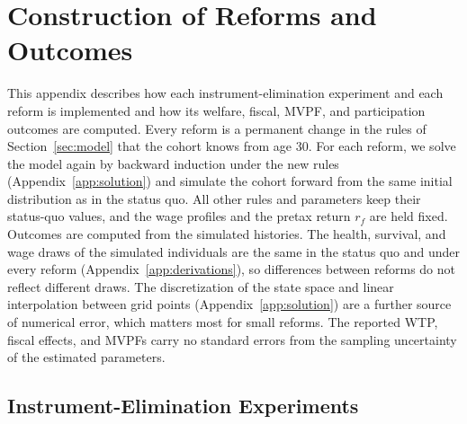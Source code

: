 \section{Construction of Reforms and Outcomes}\label{app:reforms}

This appendix describes how each instrument-elimination experiment and each reform is implemented and how its welfare, fiscal, MVPF, and participation outcomes are computed. Every reform is a permanent change in the rules of Section~\ref{sec:model} that the cohort knows from age 30. For each reform, we solve the model again by backward induction under the new rules (Appendix~\ref{app:solution}) and simulate the cohort forward from the same initial distribution as in the status quo. All other rules and parameters keep their status-quo values, and the wage profiles and the pretax return $r_f$ are held fixed. Outcomes are computed from the simulated histories. The health, survival, and wage draws of the simulated individuals are the same in the status quo and under every reform (Appendix~\ref{app:derivations}), so differences between reforms do not reflect different draws. The discretization of the state space and linear interpolation between grid points (Appendix~\ref{app:solution}) are a further source of numerical error, which matters most for small reforms. The reported WTP, fiscal effects, and MVPFs carry no standard errors from the sampling uncertainty of the estimated parameters. %

\subsection{Instrument-Elimination Experiments}

